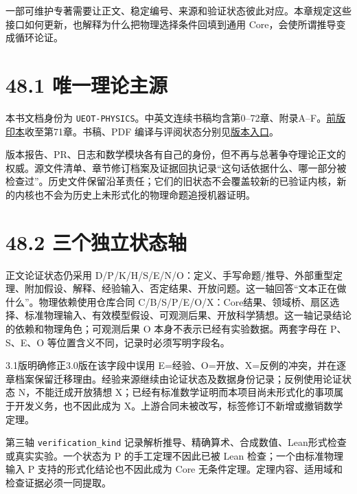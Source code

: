 \documentclass[
  11pt,
  oneside]{book}
\begin{document}
一部可维护专著需要让正文、稳定编号、来源和验证状态彼此对应。本章规定这些接口如何更新，也解释为什么把物理选择条件回填到通用
Core，会使所谓推导变成循环论证。

\section{48.1 唯一理论主源}

本书文档身份为
\texttt{UEOT-\allowbreak PHYSICS}。中英文连续书稿均含第0--72章、附录A--F。\href{https://github.com/MurphyHoops/UEOT/blob/cc5670d5f2ac96f8\allowbreak 8270c0f38ae6fb6f\allowbreak 77e26093/physics/qm/book/UEOT_PHYSICS.pdf}{前版印本}收至第71章。书稿、PDF
编译与评阅状态分别见\href{README.md}{版本入口}。

版本报告、PR、日志和数学模块各有自己的身份，但不再与总著争夺理论正文的权威。源文件清单、章节修订档案及证据回执记录``这句话依据什么、哪一部分被检查过''。历史文件保留沿革责任；它们的旧状态不会覆盖较新的已验证内核，新的内核也不会为历史上未形式化的物理命题追授机器证明。

\section{48.2 三个独立状态轴}

正文论证状态仍采用
D/P/K/H/S/E/N/O：定义、手写命题/推导、外部重型定理、附加假设、解释、经验输入、否定结果、开放问题。这一轴回答``文本正在做什么''。物理依赖使用仓库合同
C/B/S/P/E/O/X：Core结果、领域桥、扇区选择、标准物理输入、有效模型假设、可观测后果、开放科学猜想。这一轴记录结论的依赖和物理角色；可观测后果
O 本身不表示已经有实验数据。两套字母在 P、S、E、O
等位置含义不同，记录时必须写明字段名。

3.1版明确修正3.0版在该字段中误用
E=经验、O=开放、X=反例的冲突，并在逐章档案保留迁移理由。经验来源继续由论证状态及数据身份记录；反例使用论证状态
N，不能迁成开放猜想
X；已经有标准数学证明而本项目尚未形式化的事项属于开发义务，也不因此成为
X。上游合同未被改写，标签修订不新增或撤销数学定理。

第三轴 \texttt{verification\_\allowbreak kind}
记录解析推导、精确算术、合成数值、Lean形式检查或真实实验。一个状态为 P
的手工定理不因此已被 Lean 检查；一个由标准物理输入 P
支持的形式化结论也不因此成为 Core
无条件定理。定理内容、适用域和检查证据必须一同提取。
\end{document}
